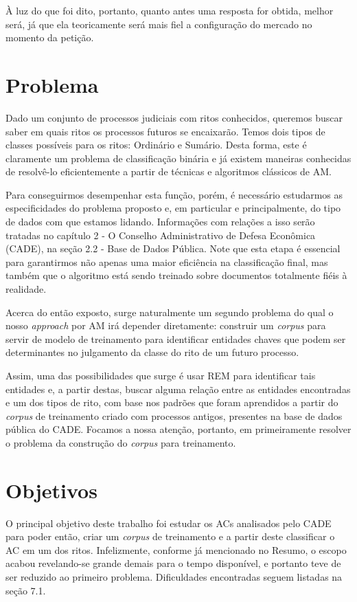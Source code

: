 \documentclass[11pt]{report}
\begin{document}
À luz do que foi dito, portanto, quanto antes uma resposta for obtida, melhor será, já que ela teoricamente será mais fiel a configuração do mercado no momento da petição.

\section{Problema}

\indent\indent Dado um conjunto de processos judiciais com ritos conhecidos, queremos buscar saber em quais ritos os processos futuros se encaixarão. Temos dois tipos de classes possíveis para os ritos:
Ordinário e Sumário. Desta forma, este é claramente um problema de classificação binária e já existem maneiras conhecidas de resolvê-lo eficientemente a partir
de técnicas e algoritmos clássicos de AM.

Para conseguirmos desempenhar esta função, porém, é necessário estudarmos as especificidades do problema proposto e, em particular e principalmente,
do tipo de dados com que estamos lidando. Informações com relações a isso serão tratadas no capítulo 2 - O Conselho Administrativo de Defesa Econômica (CADE), na seção 2.2 - Base de Dados Pública.
Note que esta etapa é essencial para garantirmos não apenas uma maior eficiência na classificação final, mas também que o algoritmo está sendo treinado sobre
documentos totalmente fiéis à realidade.

Acerca do então exposto, surge naturalmente um segundo problema do qual o nosso \textit{approach} por AM irá depender diretamente: construir um \textit{corpus} para servir de modelo de
treinamento para identificar entidades chaves que podem ser determinantes no julgamento da classe do rito de um futuro processo.

Assim, uma das possibilidades que surge é usar REM para identificar tais entidades e, a partir destas, buscar alguma relação entre as entidades encontradas e um dos tipos de rito, com
base nos padrões que foram aprendidos a partir do \textit{corpus} de treinamento criado com processos antigos, presentes na base de dados pública do CADE. Focamos
a nossa atenção, portanto, em primeiramente resolver o problema da construção do \textit{corpus} para treinamento.

\section{Objetivos}

\indent\indent O principal objetivo deste trabalho foi estudar os ACs analisados pelo CADE para poder então, criar um \textit{corpus} de treinamento e a partir deste classificar
o AC em um dos ritos. Infelizmente, conforme já mencionado no Resumo, o escopo acabou revelando-se grande demais para o tempo disponível, e portanto teve de ser reduzido
ao primeiro problema. Dificuldades encontradas seguem listadas na seção 7.1.
\end{document}
